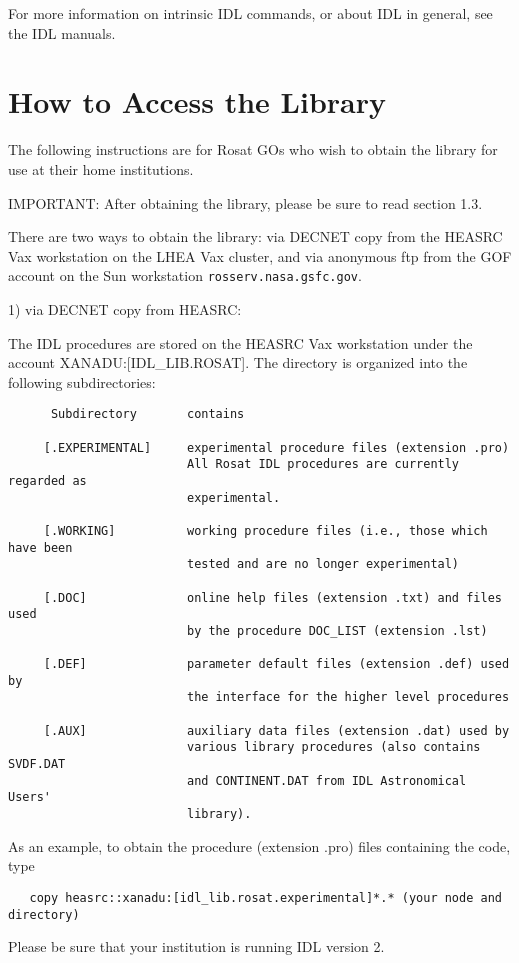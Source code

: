 For more information on intrinsic IDL commands, or about IDL in general, see
the IDL manuals.
 

\section{How to Access the Library}
 
The following instructions are for Rosat GOs who wish to obtain the library
for use at their home institutions.
 
IMPORTANT: After obtaining the library, please be sure to read section 1.3.
 
There are two ways to obtain the library: via DECNET copy from the HEASRC
Vax workstation on the LHEA Vax cluster, and via anonymous ftp from the GOF
account on the Sun workstation {\tt rosserv.nasa.gsfc.gov}.
 
1) via DECNET copy from HEASRC:
 
The IDL procedures are stored on the HEASRC Vax workstation under the
account XANADU:[IDL{\_}LIB.ROSAT].  The directory is organized into the following
subdirectories:

\medskip\noindent
\begin{verbatim}
      Subdirectory       contains
 
     [.EXPERIMENTAL]     experimental procedure files (extension .pro)
                         All Rosat IDL procedures are currently regarded as
                         experimental.
 
     [.WORKING]          working procedure files (i.e., those which have been
                         tested and are no longer experimental)
 
     [.DOC]              online help files (extension .txt) and files used
                         by the procedure DOC_LIST (extension .lst)
 
     [.DEF]              parameter default files (extension .def) used by
                         the interface for the higher level procedures
 
     [.AUX]              auxiliary data files (extension .dat) used by
                         various library procedures (also contains SVDF.DAT
                         and CONTINENT.DAT from IDL Astronomical Users'
                         library).
\end{verbatim}
As an example, to obtain the procedure (extension .pro) files containing
the code, type

\medskip\noindent
\begin{verbatim}
   copy heasrc::xanadu:[idl_lib.rosat.experimental]*.* (your node and directory)
\end{verbatim}
Please be sure that your institution is running IDL version 2.
 
